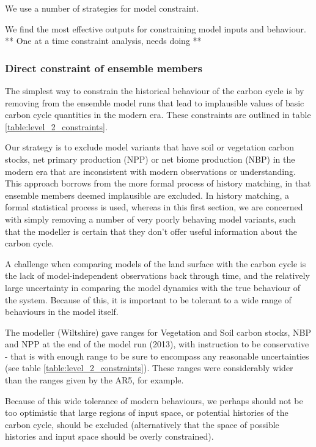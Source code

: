 \documentclass[gmd, manuscript]{copernicus}
\begin{document}
We use a number of strategies for model constraint.

We find the most effective outputs for constraining model inputs and behaviour. ** One at a time constraint analysis, needs doing **


\subsubsection{Direct constraint of ensemble members}

The simplest way to constrain the historical behaviour of the carbon cycle is by removing from the ensemble model runs that lead to implausible values of basic carbon cycle quantities in the modern era. These constraints are outlined in table \ref{table:level_2_constraints}.

Our strategy is to exclude model variants that have soil or vegetation carbon stocks, net primary production (NPP) or net biome production (NBP) in the modern era that are inconsistent with modern observations or understanding. This approach borrows from the more formal process of history matching, in that ensemble members deemed implausible are excluded. In history matching, a formal statistical process is used, whereas in this first section, we are concerned with simply removing a number of very poorly behaving model variants, such that the modeller is certain that they don't offer useful information about the carbon cycle.

A challenge when comparing models of the land surface with the carbon cycle is the lack of model-independent observations back through time, and the relatively large uncertainty in comparing the model dynamics with the true behaviour of the system. Because of this, it is important to be tolerant to a wide range of behaviours in the model itself. 

The modeller (Wiltshire) gave ranges for Vegetation and Soil carbon stocks, NBP and NPP at the end of the model run (2013), with instruction to be conservative - that is with enough range to be sure to encompass any reasonable uncertainties (see table \ref{table:level_2_constraints}). These ranges were considerably wider than the ranges given by the AR5, for example.

Because of this wide tolerance of modern behaviours, we perhaps should not be too optimistic that large regions of input space, or potential histories of the carbon cycle, should be excluded (alternatively that the space of possible histories and input space should be overly constrained).
\end{document}
